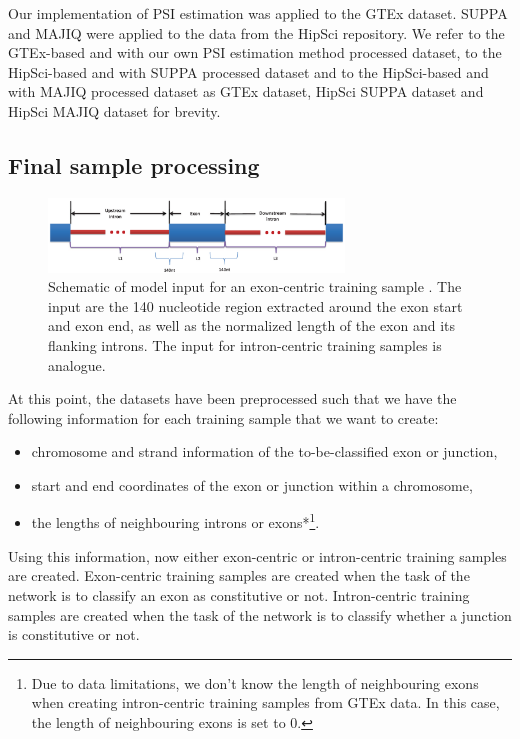 Our implementation of PSI estimation was applied to the GTEx dataset. SUPPA and MAJIQ were applied to the data from the HipSci repository. We refer to the GTEx-based and with our own PSI estimation method processed dataset, to the HipSci-based and with SUPPA processed dataset and to the HipSci-based and with MAJIQ processed dataset as GTEx dataset, HipSci SUPPA dataset and HipSci MAJIQ dataset for brevity. 
\subsection{Final sample processing} \label{subsec:finalsampleprocessing}

\begin{figure}
	\centering\includegraphics[width=0.7\textwidth]{../visualizations/ch4-methods/input_schematic.png} 
	\caption{Schematic of model input for an exon-centric training sample \cite{dsc}. The input are the 140 nucleotide region extracted around the exon start and exon end, as well as the normalized length of the exon and its flanking introns. The input for intron-centric training samples is analogue.}
	\label{fig:inputschematic}
\end{figure}

At this point, the datasets have been preprocessed such that we have the following information for each training sample that we want to create: 
\begin{itemize}
	\item chromosome and strand information of the to-be-classified exon or junction,
	\item start and end coordinates of the exon or junction within a chromosome,
	\item the lengths of neighbouring introns or exons*\footnote{Due to data limitations, we don't know the length of neighbouring exons when creating intron-centric training samples from GTEx data. In this case, the length of neighbouring exons is set to 0. }.
\end{itemize}

Using this information, now either exon-centric or intron-centric training samples are created. Exon-centric training samples are created when the task of the network is to classify an exon as constitutive or not. Intron-centric training samples are created when the task of the network is to classify whether a junction is constitutive or not.



